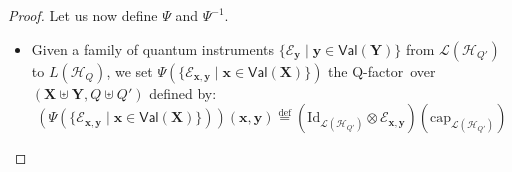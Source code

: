 \documentclass[10pt,a4paper]{article}
\newcommand*{\ie}{\emph{i.e.}\xspace}
\newcommand*{\defeq}{\stackrel{\text{def}}{=}}
\newcommand*{\tens}{\otimes}
\newcommand*{\setofrv}[1]{\mathsf{Val}(#1)}
\newcommand{\bX}{\mathbf X}
\newcommand{\bY}{\mathbf Y}
\newcommand{\bx}{{\mathbf x}}
\newcommand{\by}{{\mathbf y}}
\newcommand{\be}{{\mathbf e}}
\newcommand{\tr}[1]{\mathrm{tr}\left(#1\right)}
\renewcommand{\L}{\mathcal{L}}
\newcommand{\Eop}{\mathcal E}
\newcommand{\HH}{\mathcal{H}}
\newcommand{\qfactfunc}[1]{\widehat{#1}}
\newcommand{\reg}{Q}
\newcommand{\qreg}{\reg}
\newcommand*{\someqfact}{\phi}
\newcommand*{\id}[1][]{\mathrm{Id}_{#1}}
\newcommand*{\qcap}[1][]{\mathrm{cap}_{#1}}
\newcommand*{\qfactor}{Q-factor}
\newcommand*{\qCPT}{Q-\textsf{cpt}\xspace}
\begin{document}
\begin{proof}
Let us now define $\Psi$ and $\Psi^{-1}$.
\begin{itemize}
\item
Given a family of quantum instruments $\{\Eop_\by \mid \by\in\setofrv{\bY}\}$ from $\L(\HH_{\qreg'})$ to $L(\HH_\qreg)$, we set $\Psi(\{\Eop_{\bx,\by} \mid \bx\in\setofrv{\bX}\})$ the \qfactor\ over $(\bX\uplus\bY,\qreg\uplus\qreg')$ defined by:
\begin{equation*}
\left(\Psi(\{\Eop_{\bx,\by} \mid \bx\in\setofrv{\bX}\})\right)(\bx,\by)
\defeq
(\id[\L(\HH_{\qreg'})] \tens \Eop_{\bx,\by})(\qcap[\L(\HH_{\qreg'})])
\end{equation*}


\end{itemize}
\end{proof}
\end{document}
